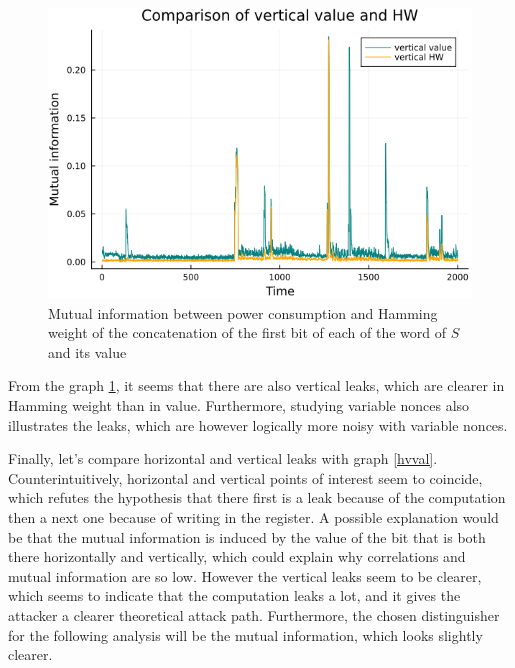 \documentclass[a4paper,11pt,twocolumn]{article}
\begin{document}
	\begin{figure}[h]
		\centering
		\includegraphics[scale=0.4]{vertical_one_bit}
		\caption{Mutual information between power consumption and Hamming weight of the concatenation of the first bit of each of the word of $S$ and its value}
		\label{vHW}
	\end{figure}
	
	
	From the graph \ref{vHW}, it seems that there are also vertical leaks, which are clearer in Hamming weight than in value. Furthermore, studying variable nonces also illustrates the leaks, which are however logically more noisy with variable nonces.
	
	Finally, let's compare horizontal and vertical leaks with graph \ref{hvval}. Counterintuitively, horizontal and vertical points of interest seem to coincide, which refutes the hypothesis that there first is a leak because of the computation then a next one because of writing in the register. A possible explanation would be that the mutual information is induced by the value of the bit that is both there horizontally and vertically, which could explain why correlations and mutual information are so low. However the vertical leaks seem to be clearer, which seems to indicate that the computation leaks a lot, and it gives the attacker a clearer theoretical attack path. Furthermore, the chosen distinguisher for the following analysis will be the mutual information, which looks slightly clearer.
	
\end{document}

